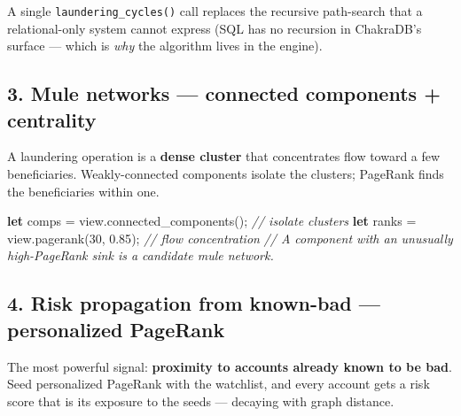 \documentclass[
  11pt,
  openany]{book}
\newenvironment{Shaded}{}{}
\newcommand{\CommentTok}[1]{\textcolor[rgb]{0.38,0.63,0.69}{\textit{#1}}}
\newcommand{\DecValTok}[1]{\textcolor[rgb]{0.25,0.63,0.44}{#1}}
\newcommand{\KeywordTok}[1]{\textcolor[rgb]{0.00,0.44,0.13}{\textbf{#1}}}
\newcommand{\NormalTok}[1]{#1}
\newcommand{\OperatorTok}[1]{\textcolor[rgb]{0.40,0.40,0.40}{#1}}
\begin{document}
A single \texttt{laundering\_cycles()} call replaces the recursive
path-search that a relational-only system cannot express (SQL has no
recursion in ChakraDB's surface --- which is \emph{why} the algorithm
lives in the engine).

\subsection{3. Mule networks --- connected components +
centrality}\label{mule-networks-connected-components-centrality}

A laundering operation is a \textbf{dense cluster} that concentrates
flow toward a few beneficiaries. Weakly-connected components isolate the
clusters; PageRank finds the beneficiaries within one.

\begin{Shaded}
\begin{Highlighting}[]
\KeywordTok{let}\NormalTok{ comps }\OperatorTok{=}\NormalTok{ view}\OperatorTok{.}\NormalTok{connected\_components()}\OperatorTok{;}               \CommentTok{// isolate clusters}
\KeywordTok{let}\NormalTok{ ranks }\OperatorTok{=}\NormalTok{ view}\OperatorTok{.}\NormalTok{pagerank(}\DecValTok{30}\OperatorTok{,} \DecValTok{0.85}\NormalTok{)}\OperatorTok{;}                   \CommentTok{// flow concentration}
\CommentTok{// A component with an unusually high{-}PageRank sink is a candidate mule network.}
\end{Highlighting}
\end{Shaded}

\subsection{4. Risk propagation from known-bad --- personalized
PageRank}\label{risk-propagation-from-known-bad-personalized-pagerank}

The most powerful signal: \textbf{proximity to accounts already known to
be bad}. Seed personalized PageRank with the watchlist, and every
account gets a risk score that is its exposure to the seeds --- decaying
with graph distance.
\end{document}
